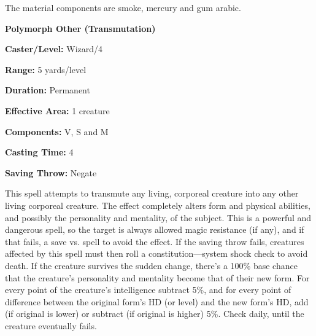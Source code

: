 \begin{multicols}{2}
The material components are smoke, mercury and gum arabic.

\vspace{1em}

\noindent
\begin{minipage}{\columnwidth}

\noindent \textbf{Polymorph Other (Transmutation)}

\noindent \textbf{Caster/Level:} Wizard/4

\noindent \textbf{Range:} 5 yards/level

\noindent \textbf{Duration:} Permanent

\noindent \textbf{Effective Area:} 1 creature

\noindent \textbf{Components:} V, S and M

\noindent \textbf{Casting Time:} 4

\noindent \textbf{Saving Throw:} Negate

\end{minipage}

This spell attempts to transmute any living, corporeal creature into any other living corporeal creature.  The effect completely alters form and physical abilities, and possibly the personality and mentality, of the subject.  This is a powerful and dangerous spell, so the target is always allowed magic resistance (if any), and if that fails, a save vs. spell to avoid the effect.  If the saving throw fails, creatures affected by this spell must then roll a constitution---system shock check to avoid death.  If the creature survives the sudden change, there's a 100\% base chance that the creature's personality and mentality become that of their new form.  For every point of the creature's intelligence subtract 5\%, and for every point of difference between the original form's HD (or level) and the new form's HD, add (if original is lower) or subtract (if original is higher) 5\%.  Check daily, until the creature eventually fails.


\end{multicols}
